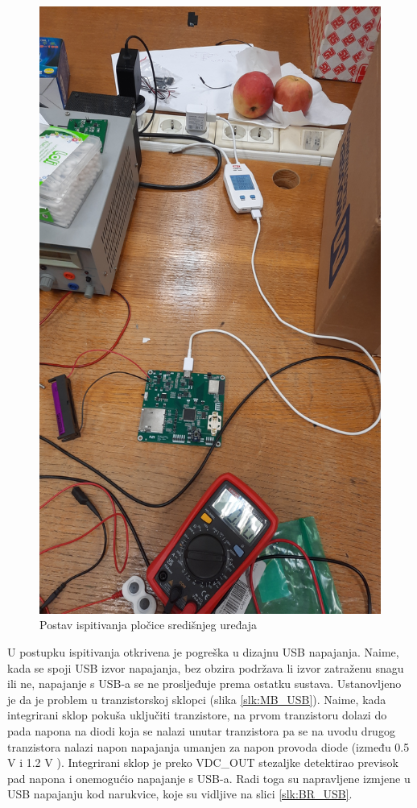 \begin{figure}[htb]
    \centering
    \includegraphics[width=10 cm]{Figures/MB_TEST_02.jpg}
    \caption{Postav ispitivanja pločice središnjeg uređaja}
    \label{slk:MB_TEST_02}
\end{figure}

U postupku ispitivanja otkrivena je pogreška u dizajnu USB napajanja. Naime, kada se spoji USB izvor napajanja, bez obzira podržava li izvor zatraženu snagu ili ne, napajanje s USB-a se ne prosljeđuje prema ostatku sustava. Ustanovljeno je da je problem u tranzistorskoj sklopci (slika \ref{slk:MB_USB}). Naime, kada integrirani sklop pokuša uključiti tranzistore, na prvom tranzistoru dolazi do pada napona na diodi koja se nalazi unutar tranzistora pa se na uvodu drugog tranzistora nalazi napon napajanja umanjen za napon provoda diode (između 0.5 V i 1.2 V \cite{di:dmp3098}). Integrirani sklop je preko VDC\_OUT stezaljke detektirao previsok pad napona i onemogućio napajanje s USB-a. Radi toga su napravljene izmjene u USB napajanju kod narukvice, koje su vidljive na slici \ref{slk:BR_USB}.


